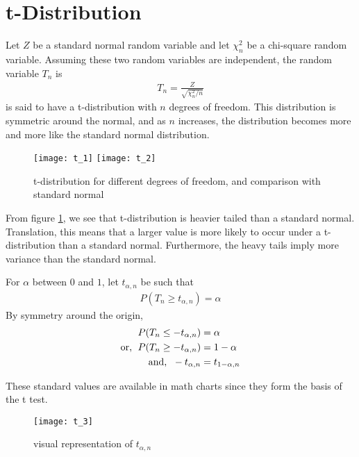 \documentclass[../probability-notes.tex]{subfiles}
\begin{document}
    \section{t-Distribution}
    Let $Z$ be a standard normal random variable and let $\chi_{n}^{2}$ be a chi-square random variable. Assuming these two random variables are independent, the random variable $T_{n}$ is
    \begin{align*}
        T_{n} = \frac{Z}{\sqrt{\chi_{n}^{2}/n}}
    \end{align*}
    is said to have a t-distribution with $n$ degrees of freedom.\newline
    This distribution is symmetric around the normal, and as $n$ increases, the distribution becomes more and more like the standard normal distribution.

    \begin{figure}[h]
    \texttt{[image: t\_1]}
    \texttt{[image: t\_2]}
    \centering
    \caption{t-distribution for different degrees of freedom, and comparison with standard normal}
    \label{fig:t_1} %
    \end{figure}

    From figure \ref{fig:t_1}, we see that t-distribution is heavier tailed than a standard normal. Translation, this means that a larger value is more likely to occur under a t-distribution than a standard normal. Furthermore, the heavy tails imply more variance than the standard normal.\newline

    For $\alpha$ between $0$ and $1$, let $t_{\alpha, n}$ be such that
    \begin{align*}
        P(T_{n} \geq t_{\alpha, n}) = \alpha
    \end{align*}
    By symmetry around the origin,
    \begin{align*}
        P(T_{n} \leq -t_{\alpha, n}) &= \alpha\\
        \text{or, \;} P(T_{n} \geq -t_{\alpha, n}) &= 1 - \alpha\\
        \text{and, \;} -t_{\alpha, n} &= t_{1 - \alpha, n}
    \end{align*}

    These standard values are available in math charts since they form the basis of the t test.

    \begin{figure}[h]
    \texttt{[image: t\_3]}
    \centering
    \caption{visual representation of $t_{\alpha,n}$}
    \label{fig:t_2} %
    \end{figure}
\end{document}
